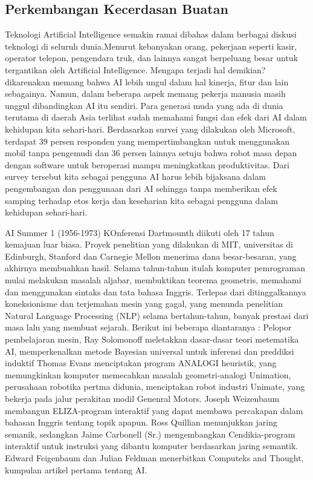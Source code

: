 \subsection{Perkembangan Kecerdasan Buatan}
    Teknologi Artificial Intelligence semakin ramai dibahas dalam berbagai diskusi teknologi di seluruh dunia.Menurut kebanyakan orang, pekerjaan seperti kasir, operator telepon, pengendara truk, dan lainnya sangat berpeluang besar untuk tergantikan oleh Artificial Intelligence. Mengapa terjadi hal demikian? dikarenakan memang bahwa AI lebih ungul dalam hal kinerja, fitur dan lain sebagainya. Namun, dalam beberapa aspek memang pekerja manusia masih unggul dibandingkan AI itu sendiri. Para generasi muda yang ada di dunia terutama di daerah Asia terlihat sudah memahami fungsi dan efek dari AI dalam kehidupan kita sehari-hari. Berdasarkan survei yang dilakukan oleh Microsoft, terdapat 39 persen responden yang mempertimbangkan untuk menggunakan mobil tanpa pengemudi dan 36 persen lainnya setuju bahwa robot masa depan dengan software untuk beroperasi mampu meningkatkan produktivitas. Dari survey tersebut kita sebagai pengguna AI harus lebih bijaksana dalam pengembangan dan penggunaan dari AI sehingga tanpa memberikan efek samping terhadap etos kerja dan keseharian kita sebagai pengguna dalam kehidupan sehari-hari.

    AI Summer 1 (1956-1973) KOnferensi Dartmounth diikuti oleh 17 tahun kemajuan luar biasa. Proyek penelitian yang dilakukan di MIT, universitas di Edinburgh, Stanford dan Carnegie Mellon menerima dana besar-besaran, yang akhirnya membuahkan hasil. Selama tahun-tahun itulah komputer pemrograman mulai melakukan masalah aljabar, membuktikan teorema geometris, memahami dan menggunakan sintaks dan tata bahasa Inggris. Terlepas dari ditinggalkannya koneksionisme dan terjemahan mesin yang gagal, yang menunda penelitian Natural Language Processing (NLP) selama bertahun-tahun, banyak prestasi dari masa lalu yang membuat sejarah. Berikut ini beberapa diantaranya : Pelopor pembelajaran mesin, Ray Solomonoff meletakkan dasar-dasar teori metematika AI, memperkenalkan metode Bayesian universal untuk inferensi dan preddiksi induktif Thomas Evans menciptakan program ANALOGI heuristik, yang memungkinkan komputer memecahkan masalah geometri-analogi Unimation, perusahaan robotika pertma didunia, menciptakan robot industri Unimate, yang bekerja pada jalur perakitan modil Genenral Motors. Joseph Weizenbaum membangun ELIZA-program interaktif yang dapat membawa percakapan dalam bahasan Inggris tentang topik apapun. Ross Quillian menunjukkan jaring semanik, sedangkan Jaime Carbonell (Sr.) mengembangkan Cendikia-program interaktif untuk instruksi yang dibantu komputer berdasarkan jaring semantik. Edward Feigenbaum dan Julian Feldman menerbitkan Computeks and Thought, kumpulan artikel pertama tentang AI.

